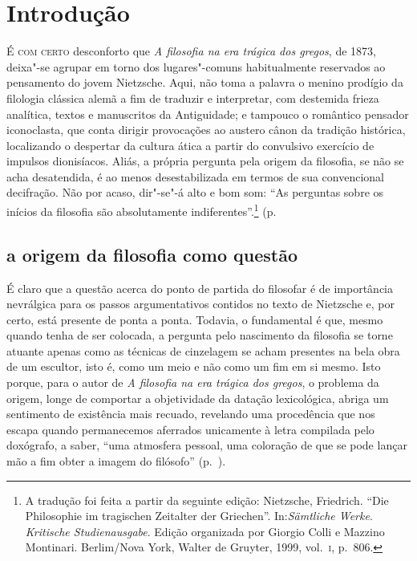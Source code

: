 
\chapter[Introdução, por Fernando R. de Moraes Barros]{Introdução}

\textsc{É com certo} desconforto que \textit{A filosofia na era trágica dos
 gregos}, de 1873, deixa"-se agrupar em torno dos lugares"-comuns
 habitualmente reservados ao pensamento do jovem Nietzsche. Aqui, não toma a
 palavra o menino prodígio da filologia clássica alemã a fim de traduzir e
 interpretar, com destemida frieza analítica, textos e manuscritos da
 Antiguidade; e tampouco o romântico pensador iconoclasta, que conta dirigir
 provocações ao austero cânon da tradição histórica, localizando o despertar
 da cultura ática a partir do convulsivo exercício de impulsos dionisíacos.
 Aliás, a própria pergunta pela origem da filosofia, se não se acha
 desatendida, é ao menos desestabilizada em termos de sua convencional
 decifração. Não por acaso, dir"-se"-á alto e bom som: ``As perguntas sobre
 os inícios da filosofia são absolutamente indiferentes''.\footnote {A
 tradução foi feita a partir da seguinte edição: Nietzsche, Friedrich. ``Die
 Philosophie im tragischen Zeitalter der Griechen''. In:\textit{Sämtliche Werke}. 
 \textit{Kritische Studienausgabe}. Edição organizada por Giorgio Colli e 
 Mazzino Montinari. Berlim/Nova York, Walter de Gruyter,
 1999, vol.~\textsc{i}, p.~806.} (p.~\pageref{perguntassobreosinicios)} 

\section{a origem da filosofia como questão} 

É claro que a questão acerca do ponto de partida do filosofar é de importância nevrálgica para os passos
 argumentativos contidos no texto de Nietzsche e, por certo, está presente de
 ponta a ponta. Todavia, o fundamental é que, mesmo quando tenha de ser
 colocada, a pergunta pelo nascimento da filosofia se torne atuante apenas
 como as técnicas de cinzelagem se acham presentes na bela obra de um
 escultor, isto é, como um meio e não como um fim em si mesmo. Isto porque,
 para o autor de
\textit{A filosofia na era trágica dos gregos}, o problema da origem, longe de
 comportar a objetividade da datação lexicológica, abriga um sentimento de
 existência mais recuado, revelando uma procedência que nos escapa quando
 permanecemos aferrados unicamente à letra compilada pelo doxógrafo, a saber,
 ``uma atmosfera pessoal, uma coloração de que se pode lançar mão a fim obter
 a imagem do filósofo'' (p.~\pageref{atmosferapessoal}). 

